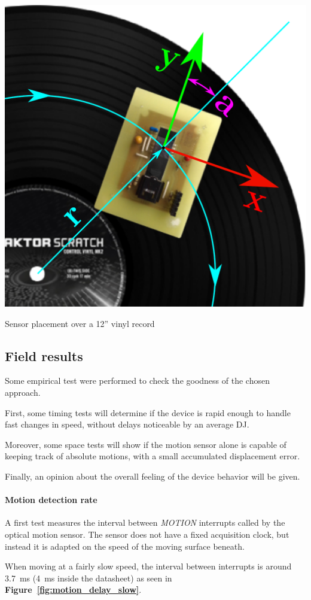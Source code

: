 \documentclass[a4paper,10pt]{article}
\makeatletter
\newenvironment{figurehere}{\def\@captype{figure}\vspace{2ex}}{\vspace{2ex}}
\newcommand{\citef}[1]{\textbf{Figure~\ref{#1}}}
\makeatother
\begin{document}
\begin{multicols}{2}
\begin{figurehere}
	\centering
	\includegraphics[keepaspectratio=true,width=0.6\columnwidth]{images/ratt_placement.pdf}
	\caption{Sensor placement over a 12'' vinyl record}
	\label{fig:ratt_placement}
\end{figurehere}


\subsection{Field results}

Some empirical test were performed to check the goodness of the chosen
approach.

First, some timing tests will determine if the device is rapid enough to
handle fast changes in speed, without delays noticeable by an average DJ.

Moreover, some space tests will show if the motion sensor alone is capable
of keeping track of absolute motions, with a small accumulated displacement
error.

Finally, an opinion about the overall feeling of the device behavior will be
given.


\paragraph{Motion detection rate}
A first test measures the interval between \emph{MOTION} interrupts called by
the optical motion sensor. The sensor does not have a fixed acquisition clock,
but instead it is adapted on the speed of the moving surface beneath.

When moving at a fairly slow speed, the interval between interrupts is around
3.7~ms (4~ms inside the datasheet) as seen in \citef{fig:motion_delay_slow}.


\end{multicols}
\end{document}
